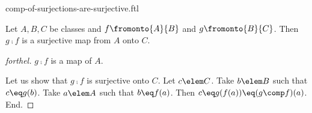 \documentclass{naproche-library}
\begin{document}
\begin{smodule}[title=Compositions of Surjections are Surjective]{comp-of-surjections-are-surjective.ftl}


\begin{proposition}[forthel,id=CompOfSurjectMapsIsSurjectProp]
  Let $A, B, C$ be classes and $f \fromonto{A}{B}$ and $g \fromonto{B}{C}$.
  Then $g \comp f$ is a surjective map from $A$ onto $C$.
\end{proposition}
\begin{proof}[forthel]
  $g \comp f$ is a map of $A$.

  Let us show that $g \comp f$ is surjective onto $C$.
    Let $c \elem C$.
    Take $b \elem B$ such that $c \eq g(b)$.
    Take $a \elem A$ such that $b \eq f(a)$.
    Then $c \eq g(f(a)) \eq (g \comp f)(a)$.
  End.
\end{proof}

\end{smodule}
\end{document}
